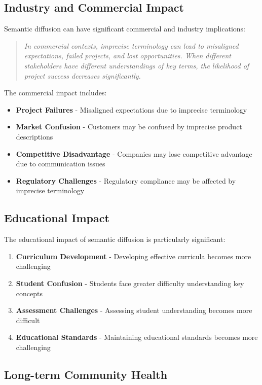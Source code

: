 \documentclass[11pt]{article}
\begin{document}
\subsection{Industry and Commercial Impact}

Semantic diffusion can have significant commercial and industry implications:

\begin{quote}
\emph{In commercial contexts, imprecise terminology can lead to misaligned expectations, failed projects, and lost opportunities. When different stakeholders have different understandings of key terms, the likelihood of project success decreases significantly.}
\end{quote}

The commercial impact includes:

\begin{itemize}
\item \textbf{Project Failures} - Misaligned expectations due to imprecise terminology
\item \textbf{Market Confusion} - Customers may be confused by imprecise product descriptions
\item \textbf{Competitive Disadvantage} - Companies may lose competitive advantage due to communication issues
\item \textbf{Regulatory Challenges} - Regulatory compliance may be affected by imprecise terminology
\end{itemize}

\subsection{Educational Impact}

The educational impact of semantic diffusion is particularly significant:

\begin{enumerate}
\item \textbf{Curriculum Development} - Developing effective curricula becomes more challenging
\item \textbf{Student Confusion} - Students face greater difficulty understanding key concepts
\item \textbf{Assessment Challenges} - Assessing student understanding becomes more difficult
\item \textbf{Educational Standards} - Maintaining educational standards becomes more challenging
\end{enumerate}

\subsection{Long-term Community Health}
\end{document}
